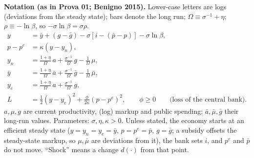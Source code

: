 \documentclass[11pt,a4paper]{article}
\begin{document}
\cabecalho

{\footnotesize\noindent\textbf{Notation (as in Prova 01; Benigno 2015).} Lower-case letters are logs (deviations from the steady
state); bars denote the long run; $\Omega\equiv\sigma^{-1}+\eta$; $\rho\equiv-\ln\beta$, so $-\sigma\ln\beta=\sigma\rho$.
\begin{align}
y&=\bar y+(g-\bar g)-\sigma[i-(\bar p-p)]-\sigma\ln\beta, \tag{AD}\label{AD}\\
p-p^e&=\kappa(y-y_n), \tag{AS}\label{AS}\\
y_n&=\tfrac{1+\eta}{\Omega}\,a+\tfrac{\sigma^{-1}}{\Omega}\,g-\tfrac{1}{\Omega}\,\mu, \tag{YN}\label{YN}\\
\bar y&=\tfrac{1+\eta}{\Omega}\,\bar a+\tfrac{\sigma^{-1}}{\Omega}\,\bar g-\tfrac{1}{\Omega}\,\bar\mu, \tag{YB}\label{YB}\\
y_e&=\tfrac{1+\eta}{\Omega}\,a+\tfrac{\sigma^{-1}}{\Omega}\,g, \tag{YE}\label{YE}\\
L&=\tfrac12(y-y_e)^2+\tfrac{\phi}{2\kappa}(p-p^e)^2,\qquad \phi\ge0\qquad\text{(loss of the central bank)}. \tag{LF}\label{LF}
\end{align}
$a,\mu,g$ are current productivity, (log) markup and public spending; $\bar a,\bar\mu,\bar g$ their long-run values. Parameters:
$\sigma,\eta,\kappa>0$. Unless stated, the economy starts at an efficient steady state ($y=y_n=y_e=\bar y$, $p=p^e=\bar p$, $g=\bar g$; a
subsidy offsets the steady-state markup, so $\mu,\bar\mu$ are deviations from it), the bank sets $i$, and $p^e$ and $\bar p$ do not
move. ``Shock'' means a change $d(\cdot)$ from that point.\par}




\end{document}
